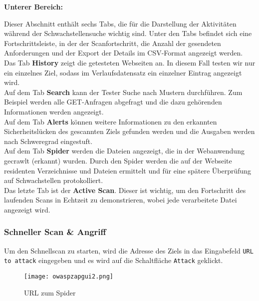 \begin{flushleft}
	\textbf{Unterer Bereich:}\\
\end{flushleft}
Dieser Abschnitt enthält sechs Tabs, die für die Darstellung der Aktivitäten während der Schwachstellensuche wichtig sind. Unter den Tabs befindet sich eine Fortschrittsleiste, in der der Scanfortschritt, die Anzahl der gesendeten Anforderungen und der Export der Details im CSV-Format angezeigt werden.\\

Das Tab \textbf{History} zeigt die getesteten Webseiten an. In diesem Fall testen wir nur ein einzelnes Ziel, sodass im Verlaufsdatensatz ein einzelner Eintrag angezeigt wird.\\

Auf dem Tab \textbf{Search} kann der Tester Suche nach Mustern durchführen. Zum Beispiel werden alle GET-Anfragen abgefragt und die dazu gehörenden Informationen werden angezeigt.\\

Auf dem Tab \textbf{Alerts} können weitere Informationen zu den erkannten Sicherheitslücken des gescannten Ziels gefunden werden und die Ausgaben werden nach Schweregrad eingestuft.\\

Auf dem Tab \textbf{Spider} werden die Dateien angezeigt, die in der Webanwendung gecrawlt (erkannt) wurden. Durch den Spider werden die auf der Webseite residenten Verzeichnisse und Dateien ermittelt und für eine spätere Überprüfung auf Schwachstellen protokolliert.\\

Das letzte Tab ist der \textbf{Active Scan}. Dieser ist wichtig, um den Fortschritt des laufenden Scans in Echtzeit zu demonstrieren, wobei jede verarbeitete Datei angezeigt wird.\\

\subsubsection{Schneller Scan \& Angriff}

Um den Schnellscan zu starten, wird die Adresse des Ziels in das Eingabefeld \texttt{URL to attack} eingegeben und es wird auf die Schaltfläche \texttt{Attack} geklickt.

\begin{figure}[h]
	\centering
	\texttt{[image: owaspzapgui2.png]}
	\caption{URL zum Spider}
	\label{quickscan2}
\end{figure}

